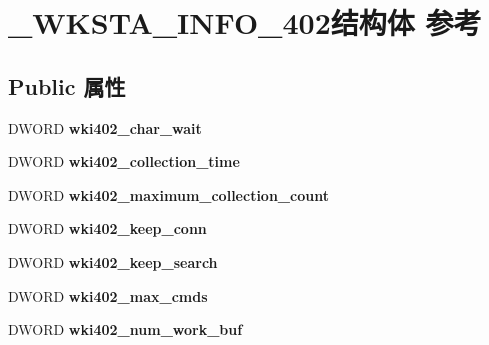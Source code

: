 \hypertarget{struct___w_k_s_t_a___i_n_f_o__402}{}\section{\+\_\+\+W\+K\+S\+T\+A\+\_\+\+I\+N\+F\+O\+\_\+402结构体 参考}
\label{struct___w_k_s_t_a___i_n_f_o__402}
\subsection*{Public 属性}
\begin{DoxyCompactItemize}
\item 
\mbox{\label{struct___w_k_s_t_a___i_n_f_o__402_a5efe832f1d19787c7f7684009a8e8c40}} 
D\+W\+O\+RD {\bfseries wki402\+\_\+char\+\_\+wait}
\item 
\mbox{\label{struct___w_k_s_t_a___i_n_f_o__402_a24de4aa0ce36013562ff1721cb520893}} 
D\+W\+O\+RD {\bfseries wki402\+\_\+collection\+\_\+time}
\item 
\mbox{\label{struct___w_k_s_t_a___i_n_f_o__402_ab973fb00a6923f4de6f25a07054a6c9d}} 
D\+W\+O\+RD {\bfseries wki402\+\_\+maximum\+\_\+collection\+\_\+count}
\item 
\mbox{\label{struct___w_k_s_t_a___i_n_f_o__402_ac6c36fdc8e11082e94b1fbf84b68b300}} 
D\+W\+O\+RD {\bfseries wki402\+\_\+keep\+\_\+conn}
\item 
\mbox{\label{struct___w_k_s_t_a___i_n_f_o__402_ac91b0b651db18350d2a76c638ecb1c1f}} 
D\+W\+O\+RD {\bfseries wki402\+\_\+keep\+\_\+search}
\item 
\mbox{\label{struct___w_k_s_t_a___i_n_f_o__402_a0dc6b70df4919202512d3dfee0c68211}} 
D\+W\+O\+RD {\bfseries wki402\+\_\+max\+\_\+cmds}
\item 
\mbox{\label{struct___w_k_s_t_a___i_n_f_o__402_a708ae1b4a1a3f91c92195748f0b41672}} 
D\+W\+O\+RD {\bfseries wki402\+\_\+num\+\_\+work\+\_\+buf}
\item 

\end{DoxyCompactItemize}
